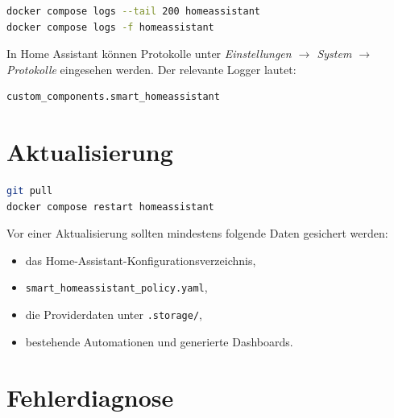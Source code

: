 \documentclass[
  11pt,
  a4paper,
  oneside,
  parskip=half
]{scrreprt}
\newcommand{\code}[1]{\texttt{#1}}
\begin{document}
\begin{lstlisting}[language=bash]
docker compose logs --tail 200 homeassistant
docker compose logs -f homeassistant
\end{lstlisting}

In Home Assistant können Protokolle unter
\emph{Einstellungen $\rightarrow$ System $\rightarrow$ Protokolle} eingesehen werden.
Der relevante Logger lautet:

\begin{lstlisting}
custom_components.smart_homeassistant
\end{lstlisting}

\section{Aktualisierung}

\begin{lstlisting}[language=bash]
git pull
docker compose restart homeassistant
\end{lstlisting}

Vor einer Aktualisierung sollten mindestens folgende Daten gesichert werden:

\begin{itemize}
  \item das Home-Assistant-Konfigurationsverzeichnis,
  \item \code{smart\_homeassistant\_policy.yaml},
  \item die Providerdaten unter \code{.storage/},
  \item bestehende Automationen und generierte Dashboards.
\end{itemize}

\section{Fehlerdiagnose}
\end{document}
